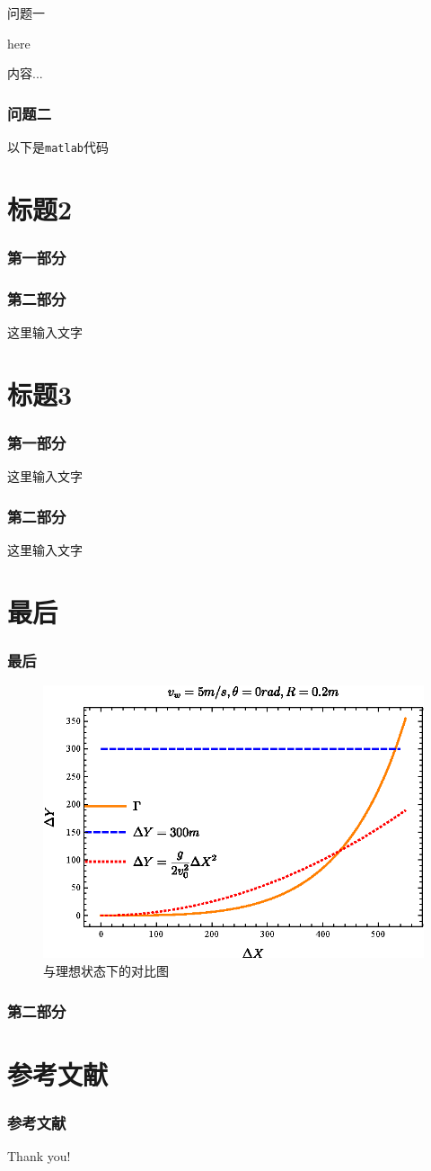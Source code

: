 \documentclass{beamer}
\begin{document}
	\begin{frame}{问题一}
		\begin{theorem}[PDE]
			here
		\end{theorem}
		\begin{definition}
			内容...
		\end{definition}
	\end{frame}
	\begin{frame}
	\frametitle{问题二}
	以下是\texttt{matlab}代码
	 
	

	\end{frame}

\section{标题2}
\begin{frame}
	\frametitle{第一部分}

\end{frame}

\begin{frame}
	\frametitle{第二部分}
	这里输入文字\cite{ref}
\end{frame}

\section{标题3}
\begin{frame}
	\frametitle{第一部分}
	这里输入文字
\end{frame}

\begin{frame}
	\frametitle{第二部分}
	这里输入文字
\end{frame}

\section{最后}
	\begin{frame}
		\frametitle{最后}
		\begin{figure}[H]
			\centering
			\includegraphics[width=0.6\linewidth]{figure/hlx-q1.eps}
			\caption{与理想状态下的对比图}
			\label{fig:hlx-q1}
		\end{figure}
	\end{frame}
	
	\begin{frame}
		\frametitle{第二部分}
	\end{frame}
	
\section{参考文献}
	\begin{frame}
		\frametitle{参考文献}
		
	\end{frame}
	\begin{frame}
		\Huge{\centerline{Thank you!}}
	\end{frame}
	
\end{document}
